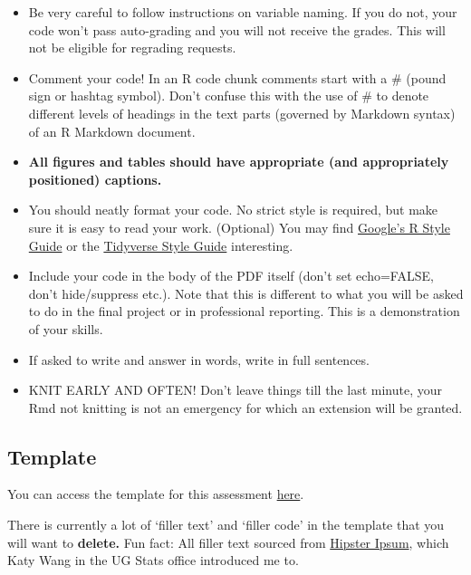 \documentclass[
  openany]{book}
\begin{document}
\begin{itemize}
\item
  Be very careful to follow instructions on variable naming. If you do not, your code won't pass auto-grading and you will not receive the grades. This will not be eligible for regrading requests.
\item
  Comment your code! In an R code chunk comments start with a \# (pound sign or hashtag symbol). Don't confuse this with the use of \# to denote different levels of headings in the text parts (governed by Markdown syntax) of an R Markdown document.
\item
  \textbf{All figures and tables should have appropriate (and appropriately positioned) captions.}
\item
  You should neatly format your code. No strict style is required, but make sure it is easy to read your work. (Optional) You may find \href{https://google.github.io/styleguide/Rguide.html\#:~:text=R\%20is\%20a\%20high\%2Dlevel,Guide\%20by\%20Hadley\%20Wickham\%20license.}{Google's R Style Guide} or the \href{https://style.tidyverse.org/}{Tidyverse Style Guide} interesting.
\item
  Include your code in the body of the PDF itself (don't set echo=FALSE, don't hide/suppress etc.). Note that this is different to what you will be asked to do in the final project or in professional reporting. This is a demonstration of your skills.
\item
  If asked to write and answer in words, write in full sentences.
\item
  KNIT EARLY AND OFTEN! Don't leave things till the last minute, your Rmd not knitting is not an emergency for which an extension will be granted.
\end{itemize}

\hypertarget{template-1}{%
\subsection{Template}\label{template-1}}

You can access the template for this assessment \href{https://jupyter.utoronto.ca/hub/user-redirect/git-pull?repo=https\%3A\%2F\%2Fgithub.com\%2Fsta303-bolton\%2Fsta303-w22-portfolio\&urlpath=rstudio\%2F\&branch=master}{here}.

There is currently a lot of `filler text' and `filler code' in the template that you will want to \textbf{delete.} Fun fact: All filler text sourced from \href{https://hipsum.co/}{Hipster Ipsum}, which Katy Wang in the UG Stats office introduced me to.
\end{document}
